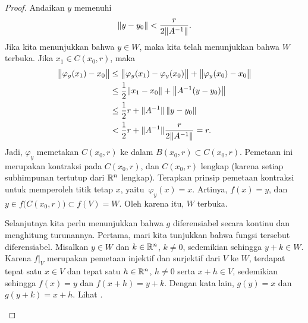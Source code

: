 \begin{proof}
Andaikan $y$ memenuhi
\begin{equation*}
\lVert {y-y_0} \rVert <
\frac{r}{2\lVert {A^{-1}} \rVert} .
\end{equation*}
Jika kita menunjukkan bahwa $y \in W$, maka kita telah menunjukkan bahwa $W$ terbuka.
Jika $x_1 \in
C(x_0,r)$, maka
\begin{equation*}
\begin{split}
\bigl\lVert {\varphi_y(x_1)-x_0} \bigr\rVert
& \leq
\bigl\lVert {\varphi_y(x_1)-\varphi_y(x_0)} \bigr\rVert +
\bigl\lVert {\varphi_y(x_0)-x_0} \bigr\rVert \\
& \leq
\frac{1}{2}\lVert {x_1-x_0} \rVert +
\bigl\lVert {A^{-1}(y-y_0)} \bigr\rVert \\
& \leq
\frac{1}{2}r +
\lVert {A^{-1}} \rVert \, \lVert {y-y_0} \rVert \\
& <
\frac{1}{2}r +
\lVert {A^{-1}} \rVert
\frac{r}{2\lVert {A^{-1}} \rVert} = r .
\end{split}
\end{equation*}
Jadi, $\varphi_y$ memetakan $C(x_0,r)$ ke dalam $B(x_0,r) \subset C(x_0,r)$.  Pemetaan ini
merupakan kontraksi pada $C(x_0,r)$, dan $C(x_0,r)$ lengkap (karena setiap subhimpunan tertutup dari
${\mathbb{R}}^n$ lengkap).
Terapkan prinsip pemetaan kontraksi untuk memperoleh titik tetap $x$,
yaitu\ $\varphi_y(x) = x$.  Artinya, $f(x) = y$, dan $y \in
f\bigl(C(x_0,r)\bigr) \subset f(V) = W$.  Oleh karena itu, $W$ terbuka.

Selanjutnya kita perlu menunjukkan bahwa $g$ diferensiabel secara kontinu dan menghitung
turunannya.  Pertama, mari kita tunjukkan bahwa fungsi tersebut diferensiabel.
Misalkan $y \in W$ dan $k \in {\mathbb{R}}^n$, $k \neq 0$, sedemikian sehingga $y+k \in W$.
Karena $f|_V$ merupakan pemetaan injektif dan surjektif dari $V$ ke $W$,
terdapat tepat satu $x \in V$ dan tepat satu
$h \in {\mathbb{R}}^n$, $h \neq 0$ serta $x+h \in V$, sedemikian sehingga
$f(x) = y$ dan $f(x+h) = y+k$.
Dengan kata lain, $g(y) = x$ dan $g(y+k) = x+h$.  Lihat
.
\begin{myfigureht}
\caption{Membuktikan bahwa $g$ diferensiabel.\label{fig:inversefuncRn2}}
\end{myfigureht}


\end{proof}
